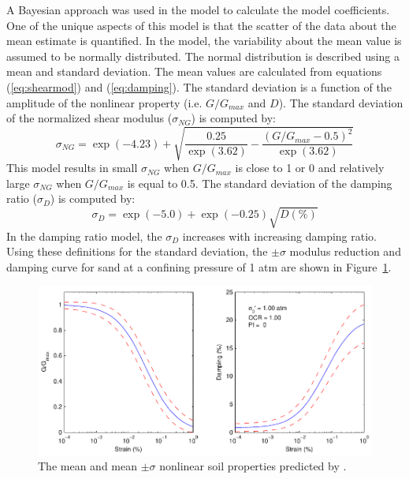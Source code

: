 \documentclass[12pt,oneside]{book}
\begin{document}
A Bayesian approach was used in the \citet{darendeli:01} model to calculate the model coefficients.
One of the unique aspects of this model is that the scatter of the data about the mean estimate is
quantified.  In the \citet{darendeli:01} model, the variability about the mean value is assumed to
be normally distributed.  The normal distribution is described using a mean and standard deviation.
The mean values are calculated from equations (\ref{eq:shearmod}) and (\ref{eq:damping}). The
standard deviation is a function of the amplitude of the nonlinear property (i.e. $G/G_{max}$ and
$D$).  The standard deviation of the normalized shear modulus ($\sigma_{NG}$) is computed by:
\begin{equation}
    \sigma_{NG} = \exp(-4.23) + \sqrt{ \frac{0.25}{\exp(3.62)} - \frac{\left(G/G_{max} -
    0.5\right)^2}{\exp(3.62)} }
    \label{eq:sigmaShear}
\end{equation}
This model results in small $\sigma_{NG}$ when $G/G_{max}$ is close to 1 or 0 and relatively large
$\sigma_{NG}$ when $G/G_{max}$ is equal to 0.5. The standard deviation of the damping ratio
($\sigma_{D}$) is computed by:
\begin{equation}
    \sigma_{D} = \exp(-5.0) + \exp(-0.25) \sqrt{D (\%)}
    \label{eq:sigmaDamping}
\end{equation}
In the damping ratio model, the $\sigma_{D}$ increases with increasing damping ratio.  Using these
definitions for the standard deviation, the $\pm\sigma$ modulus reduction and damping curve for sand
at a confining pressure of 1 atm are shown in Figure~\ref{fig:siteResponse:nlEmpiricalSigma}.

\begin{figure}[tb]
    \begin{center}
        \includegraphics[width=\linewidth]{figures/siteResponse/nlEmpiricalSigma.pdf}
    \end{center}
    \caption{The mean and mean $\pm\sigma$ nonlinear soil properties predicted by \citet{darendeli:01}.}
    \label{fig:siteResponse:nlEmpiricalSigma}
\end{figure}
\clearpage 
\end{document}

